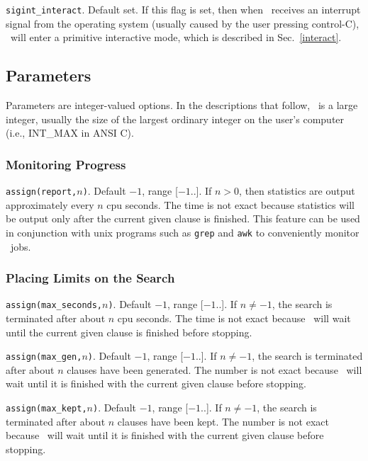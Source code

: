 \documentclass[11pt]{article}
\begin{document}
\noindent
\verb:sigint_interact:.  Default set.  If this flag is set, then
when \otter\ receives an interrupt signal from the operating
system (usually caused by the user pressing control-C),
\otter\ will enter a primitive interactive mode, which is described in
Sec.~\ref{interact}.

\subsection{Parameters}

Parameters are integer-valued options.
In the descriptions that follow,
\maxint\ is a large integer, usually the size of the largest
ordinary integer on the user's computer (i.e., INT\_MAX in ANSI C).

\subsubsection{Monitoring Progress}

\verb:assign(report,:$n$\verb:):.  Default $-1$, range [$-1$..\maxint ].  If $n>0$,
then statistics are output approximately every $n$ {\sc cpu} seconds.  The
time is not exact because statistics will be output only after the
current given clause is finished.  This feature can be used in
conjunction with {\sc unix} programs such as \verb:grep: and
\verb:awk: to conveniently monitor \otter\ jobs.

\subsubsection{Placing Limits on the Search}

\verb:assign(max_seconds,:$n$\verb:):.  Default $-1$, range [$-1$..\maxint ].  If $n\neq -1$,
the search is terminated after about $n$ {\sc cpu} seconds.
The time is not exact because \otter\ will wait until the current
given clause is finished before stopping.

\noindent
\verb:assign(max_gen,:$n$\verb:):.  Default $-1$, range [$-1$..\maxint ].  If $n\neq -1$,
the search is terminated after about $n$ clauses have been
generated.  The number is not exact because \otter\ will wait until it is
finished with the current given clause before stopping.

\noindent
\verb:assign(max_kept,:$n$\verb:):.  Default $-1$, range [$-1$..\maxint ].  If $n\neq -1$,
the search is terminated after about $n$ clauses have been
kept.  The number is not exact because \otter\ will wait until it is
finished with the current given clause before stopping.
\end{document}
